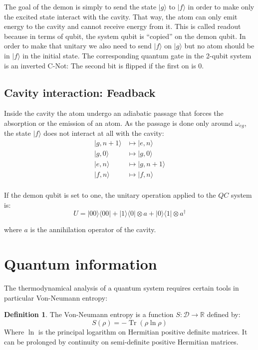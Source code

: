 \documentclass[10pt,a4paper]{report}
\theoremstyle{plain}
\theoremstyle{definition}
\newtheorem{defn}{Definition}[chapter]
\theoremstyle{remark}
\newcommand{\R}{\ensuremath{\mathbb{R}}}
\newcommand{\ket}[1]{|#1\rangle}
\newcommand{\bra}[1]{\langle#1|}
\DeclareMathOperator{\Tr}{Tr}
\begin{document}
The goal of the demon is simply to send the state $\ket g$ to $\ket f$ in order
to make only the excited state interact with the cavity. That way, the atom can
only emit energy to the cavity and cannot receive energy from it. This is called
readout because in terms of qubit, the system qubit is ``copied'' on the demon
qubit. In order to make that unitary we also need to send $\ket f$ on $\ket g$
but no atom should be in $\ket f$ in the initial state. The corresponding quantum
gate in the 2-qubit system is an inverted C-Not: The second bit is flipped if
the first on is 0.

\subsection{Cavity interaction: Feadback}

Inside the cavity the atom undergo an adiabatic passage that forces the absorption
or the emission of an atom. As the passage is done only around
$\omega_{eg}$, the state $\ket f$ does not interact at all with the cavity:
\begin{align*}
  \ket{g,n+1} &\mapsto \ket{e,n}\\
  \ket{g,0} &\mapsto \ket{g,0}\\
  \ket{e,n} &\mapsto \ket{g,n+1}\\
  \ket{f,n} &\mapsto \ket{f,n}\\
\end{align*}

If the demon qubit is set to one, the unitary operation applied to the $QC$
system is:
\[U = \ket{00}\bra{00} + \ket 1 \bra 0 \otimes a + \ket 0 \bra 1 \otimes a^\dagger\]

where $a$ is the annihilation operator of the cavity.



\section{Quantum information}

The thermodynamical analysis of a quantum system requires certain tools in
particular Von-Neumann entropy:

\begin{defn}
  The Von-Neumann entropy is a function $S : \mathcal{D} \to \R$ defined by:
  \[S(\rho) = - \Tr(\rho \ln \rho)\]
  Where $\ln$ is the principal logarithm on Hermitian positive definite matrices.
  It can be prolonged by continuity on semi-definite positive Hermitian matrices.
\end{defn}
\end{document}
